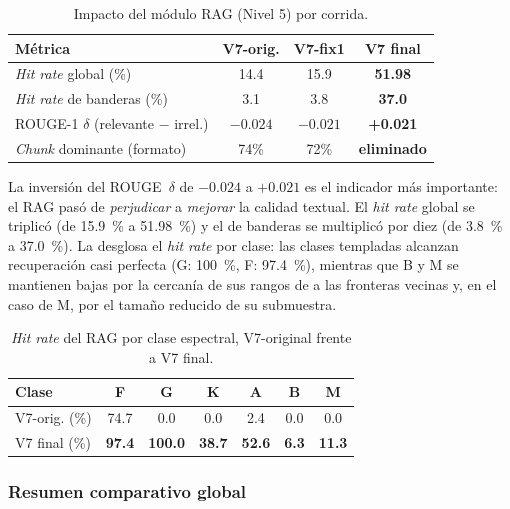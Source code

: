 \begin{table}[H]
  \centering
  \caption{Impacto del módulo RAG (Nivel 5) por corrida.}
  \label{tab:l5}
  \begin{tabular}{lccc}
    \toprule
    Métrica & V7-orig. & V7-fix1 & \textbf{V7 final} \\
    \midrule
    \emph{Hit rate} global (\%)            & 14.4 & 15.9 & \textbf{51.98} \\
    \emph{Hit rate} de banderas (\%)       & 3.1  & 3.8  & \textbf{37.0} \\
    ROUGE-1 $\delta$ (relevante $-$ irrel.) & $-0.024$ & $-0.021$ & \textbf{+0.021} \\
    \emph{Chunk} dominante (formato)       & 74\% & 72\% & \textbf{eliminado} \\
    \bottomrule
  \end{tabular}
\end{table}

La inversión del ROUGE~$\delta$ de $-0.024$ a $+0.021$ es el indicador más
importante: el RAG pasó de \emph{perjudicar} a \emph{mejorar} la calidad textual.
El \emph{hit rate} global se triplicó (de \SI{15.9}{\percent} a
\SI{51.98}{\percent}) y el de banderas se multiplicó por diez (de \SI{3.8}{\percent}
a \SI{37.0}{\percent}). La  desglosa el \emph{hit rate} por
clase: las clases templadas alcanzan recuperación casi perfecta (G:
\SI{100}{\percent}, F: \SI{97.4}{\percent}), mientras que B y M se mantienen bajas
por la cercanía de sus rangos de \teff{} a las fronteras vecinas y, en el caso de
M, por el tamaño reducido de su submuestra.

\begin{table}[H]
  \centering
  \caption{\emph{Hit rate} del RAG por clase espectral, V7-original frente a
  V7 final.}
  \label{tab:l5-clase}
  \begin{tabular}{lcccccc}
    \toprule
    Clase & F & G & K & A & B & M \\
    \midrule
    V7-orig. (\%) & 74.7 & 0.0 & 0.0 & 2.4 & 0.0 & 0.0 \\
    V7 final (\%) & \textbf{97.4} & \textbf{100.0} & \textbf{38.7} & \textbf{52.6} & \textbf{6.3} & \textbf{11.3} \\
    \bottomrule
  \end{tabular}
\end{table}

\subsubsection{Resumen comparativo global}
\label{sec:res-resumen}

